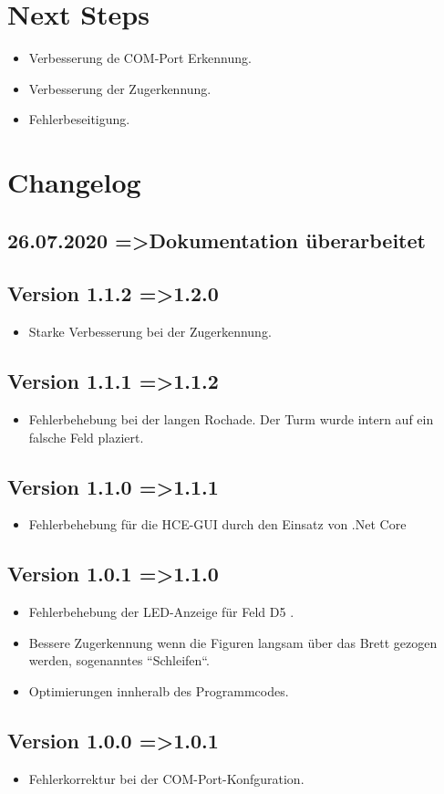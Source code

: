 \documentclass[11pt,a4paper]{article}
\begin{document}
\section{Next Steps}
\begin{itemize}
	\item Verbesserung de COM-Port Erkennung.
	\item Verbesserung der Zugerkennung.
	\item Fehlerbeseitigung.
\end{itemize}

\pagebreak

\section{Changelog}
\subsection{26.07.2020 =\textgreater Dokumentation überarbeitet}
\subsection{Version 1.1.2 =\textgreater 1.2.0}
\begin{itemize}
	\item Starke Verbesserung bei der Zugerkennung.
\end{itemize}
\subsection{Version 1.1.1 =\textgreater 1.1.2}
\begin{itemize}
	\item Fehlerbehebung bei der langen Rochade. Der Turm wurde intern auf ein falsche Feld plaziert.
\end{itemize}
\subsection{Version 1.1.0 =\textgreater 1.1.1}
\begin{itemize}
	\item Fehlerbehebung für die HCE-GUI durch den Einsatz von .Net Core
\end{itemize}
\subsection{Version 1.0.1 =\textgreater 1.1.0}
\begin{itemize}
	\item Fehlerbehebung der LED-Anzeige für Feld D5 .
    \item Bessere Zugerkennung wenn die Figuren langsam über das Brett gezogen werden, sogenanntes ``Schleifen``.
    \item Optimierungen innheralb des Programmcodes.
\end{itemize}
\subsection{Version 1.0.0 =\textgreater 1.0.1}
\begin{itemize}
	\item Fehlerkorrektur bei der COM-Port-Konfguration.
\end{itemize}
\end{document}
